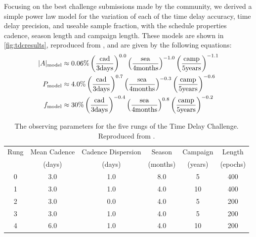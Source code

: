 Focusing on the best challenge
submissions made by the community, we derived a simple power law model
for the variation of each of the time delay accuracy, time delay
precision, and useable sample fraction, with the schedule properties
cadence, season length and campaign length. These models are shown in
\autoref{fig:tdcresults}, reproduced from \citet{LiaoEtal2015}, and are
given by the following equations:
\begin{align}
|A|_{\rm model} &\approx 0.06\% \left(\frac{\rm cad} {\rm 3 days}  \right)^{0.0}
                          \left(\frac{\rm sea}  {\rm 4 months}\right)^{-1.0}
                          \left(\frac{\rm camp}{\rm 5 years} \right)^{-1.1} \notag \\
  P_{\rm model} &\approx 4.0\% \left(\frac{\rm cad} {\rm 3 days}  \right)^{ 0.7}
                         \left(\frac{\rm sea}  {\rm 4 months}\right)^{-0.3}
                         \left(\frac{\rm camp}{\rm 5 years} \right)^{-0.6} \notag \\
  f_{\rm model} &\approx 30\% \left(\frac{\rm cad} {\rm 3 days}  \right)^{-0.4}
                        \left(\frac{\rm sea}  {\rm 4 months}\right)^{ 0.8}
                        \left(\frac{\rm camp}{\rm 5 years} \right)^{-0.2} \notag
\end{align}

\begin{table}
\begin{center}
\capstart
\begin{tabular}{cccccc} \hline\hline
  Rung &  Mean Cadence & Cadence Dispersion & Season   & Campaign & Length   \\
       &  (days)       & (days)             & (months) & (years)  & (epochs) \\ \hline
  0    &    3.0        &   1.0              &   8.0    &    5     & 400      \\
  1    &    3.0        &   1.0              &   4.0    &    10    & 400      \\
  2    &    3.0        &   0.0              &   4.0    &    5     & 200      \\
  3    &    3.0        &   1.0              &   4.0    &    5     & 200      \\
  4    &    6.0        &   1.0              &   4.0    &    10    & 200      \\
\hline\hline
\end{tabular}
\end{center}
\caption{The observing parameters for the five rungs of the Time Delay
Challenge. Reproduced from \citet{LiaoEtal2015}.\label{tab:tdcrungs}}
\end{table}

